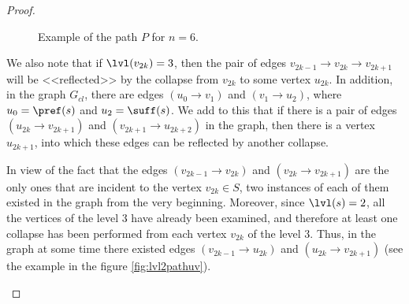 \begin{proof}
\begin{figure}[ht]
\begin{center}

\end{center}

\caption{Example of the path $P$ for $n=6$.}\label{fig:lvl2path6}
\end{figure}

We also note that if $ \lvl (v_{2k}) = 3 $, then the pair of edges $ v_{2k-1} \to v_{2k} \to v_{2k + 1} $ will be <<reflected>> by the collapse from $ v_{2k} $ to some vertex $ u_{2k} $. In addition, in the graph $ G_{cl} $, there are edges $ (u_0 \to v_1) $ and $ (v_1 \to u_2) $, where $ u_0 = \pref (s) $ and $ u_2 = \suff (s) $. We add to this that if there is a pair of edges $ (u_{2k} \to v_{2k + 1}) $ and $ (v_{2k + 1} \to u_{2k + 2}) $ in the graph, then there is a vertex $ u_{2k + 1} $, into which these edges can be reflected by another collapse.

In view of the fact that the edges $ (v_{2k-1} \to v_{2k}) $ and $ (v_{2k} \to v_{2k + 1}) $ are the only ones that are incident to the vertex $ v_{2k} \in S $, two instances of each of them existed in the graph from the very beginning. Moreover, since $ \lvl (s) = 2 $, all the vertices of the level $ 3 $ have already been examined, and therefore at least one collapse has been performed from each vertex $ v_ {2k} $ of the level $ 3 $. Thus, in the graph at some time there existed edges $ (v_{2k-1} \to u_{2k}) $ and $ (u_{2k} \to v_{2k + 1}) $ (see the example in the figure \ref {fig:lvl2pathuv}).

\begin{figure}[ht]
\begin{center}


\end{center}
\end{figure}
\end{proof}
